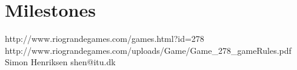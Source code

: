 \documentclass[12pt,a4paper,notitlepage]{article}
\begin{document}
\pagebreak

\section{Milestones}



\begin{thebibliography}{9}
 http://www.riograndegames.com/games.html?id=278
 http://www.riograndegames.com/uploads/Game/Game\_278\_gameRules.pdf
 Simon Henriksen shen{\makeatletter @\makeatother}itu.dk
\end{thebibliography}
\end{document}
